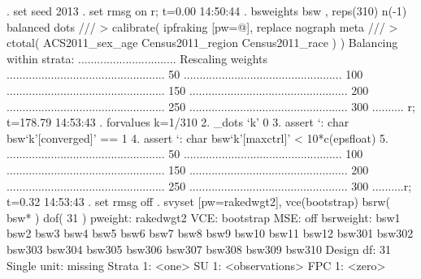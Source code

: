 . set seed 2013
{\smallskip}
. set rmsg on
r; t=0.00 14:50:44
{\smallskip}
. bsweights bsw , reps(310) n(-1) balanced dots ///
>     calibrate( ipfraking [pw=@], replace nograph meta ///
>     ctotal( ACS2011_sex_age Census2011_region Census2011_race ) )
Balancing within strata:
...............................
{\smallskip}
Rescaling weights
..................................................    50
..................................................   100
..................................................   150
..................................................   200
..................................................   250
..................................................   300
..........
{\smallskip}
r; t=178.79 14:53:43
{\smallskip}
. forvalues k=1/310 {\lbr}
  2.     _dots `k' 0
  3.     assert `: char bsw`k'[converged]' == 1
  4.     assert `: char bsw`k'[maxctrl]' < 10*c(epsfloat)
  5. {\rbr}
..................................................    50
..................................................   100
..................................................   150
..................................................   200
..................................................   250
..................................................   300
..........r; t=0.32 14:53:43
{\smallskip}
. set rmsg off
{\smallskip}
. svyset [pw=rakedwgt2], vce(bootstrap) bsrw( bsw* ) dof( 31 )
{\smallskip}
      pweight: rakedwgt2
          VCE: bootstrap
          MSE: off
    bsrweight: bsw1 bsw2 bsw3 bsw4 bsw5 bsw6 bsw7 bsw8 bsw9 bsw10 bsw11 bsw12
\oom
               bsw301 bsw302 bsw303 bsw304 bsw305 bsw306 bsw307 bsw308 bsw309
               bsw310
    Design df: 31
  Single unit: missing
     Strata 1: <one>
         SU 1: <observations>
        FPC 1: <zero>
{\smallskip}
